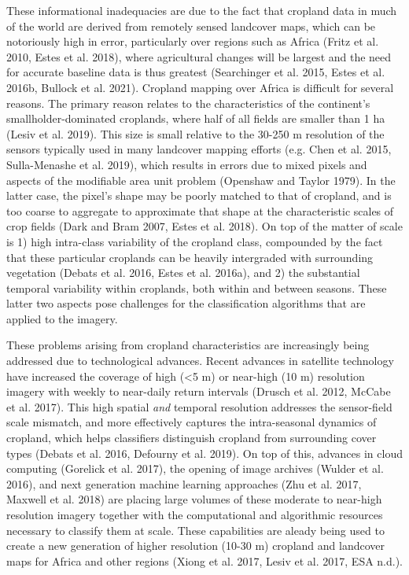 \documentclass[11pt,a4paper]{article}
\begin{document}
These informational inadequacies are due to the fact that cropland data
in much of the world are derived from remotely sensed landcover maps,
which can be notoriously high in error, particularly over regions such
as Africa (Fritz et al. 2010, Estes et al. 2018), where agricultural
changes will be largest and the need for accurate baseline data is thus
greatest (Searchinger et al. 2015, Estes et al. 2016b, Bullock et al.
2021). Cropland mapping over Africa is difficult for several reasons.
The primary reason relates to the characteristics of the continent's
smallholder-dominated croplands, where half of all fields are smaller
than 1 ha (Lesiv et al. 2019). This size is small relative to the 30-250
m resolution of the sensors typically used in many landcover mapping
efforts (e.g. Chen et al. 2015, Sulla-Menashe et al. 2019), which
results in errors due to mixed pixels and aspects of the modifiable area
unit problem (Openshaw and Taylor 1979). In the latter case, the pixel's
shape may be poorly matched to that of cropland, and is too coarse to
aggregate to approximate that shape at the characteristic scales of crop
fields (Dark and Bram 2007, Estes et al. 2018). On top of the matter of
scale is 1) high intra-class variability of the cropland class,
compounded by the fact that these particular croplands can be heavily
intergraded with surrounding vegetation (Debats et al. 2016, Estes et
al. 2016a), and 2) the substantial temporal variability within
croplands, both within and between seasons. These latter two aspects
pose challenges for the classification algorithms that are applied to
the imagery.

These problems arising from cropland characteristics are increasingly
being addressed due to technological advances. Recent advances in
satellite technology have increased the coverage of high (\textless5 m)
or near-high (10 m) resolution imagery with weekly to near-daily return
intervals (Drusch et al. 2012, McCabe et al. 2017). This high spatial
\emph{and} temporal resolution addresses the sensor-field scale
mismatch, and more effectively captures the intra-seasonal dynamics of
cropland, which helps classifiers distinguish cropland from surrounding
cover types (Debats et al. 2016, Defourny et al. 2019). On top of this,
advances in cloud computing (Gorelick et al. 2017), the opening of image
archives (Wulder et al. 2016), and next generation machine learning
approaches (Zhu et al. 2017, Maxwell et al. 2018) are placing large
volumes of these moderate to near-high resolution imagery together with
the computational and algorithmic resources necessary to classify them
at scale. These capabilities are aleady being used to create a new
generation of higher resolution (10-30 m) cropland and landcover maps
for Africa and other regions (Xiong et al. 2017, Lesiv et al. 2017, ESA
n.d.).
\end{document}
